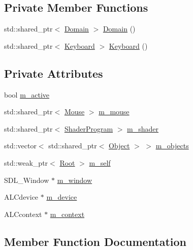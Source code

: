 \subsection*{Private Member Functions}
\begin{DoxyCompactItemize}
\item 
std\+::shared\+\_\+ptr$<$ \mbox{\hyperlink{class_domain}{Domain}} $>$ \mbox{\hyperlink{classharu_1_1_root_a1fd00f081aeeaf09eea1347bdd22ba2a}{Domain}} ()
\item 
std\+::shared\+\_\+ptr$<$ \mbox{\hyperlink{class_keyboard}{Keyboard}} $>$ \mbox{\hyperlink{classharu_1_1_root_a4d3ca0f98e581f98868f76e003c6d710}{Keyboard}} ()
\end{DoxyCompactItemize}
\subsection*{Private Attributes}
\begin{DoxyCompactItemize}
\item 
bool \mbox{\hyperlink{classharu_1_1_root_a5e251a25155fd4cb55b488b6520e1bd4}{m\+\_\+active}}
\item 
std\+::shared\+\_\+ptr$<$ \mbox{\hyperlink{classharu_1_1_mouse}{Mouse}} $>$ \mbox{\hyperlink{classharu_1_1_root_a1d9f5606aebb0fda4a6eb5ca5970c9d1}{m\+\_\+mouse}}
\item 
std\+::shared\+\_\+ptr$<$ \mbox{\hyperlink{classharu_1_1_shader_program}{Shader\+Program}} $>$ \mbox{\hyperlink{classharu_1_1_root_af62f9d3dc17742091234295bd4c6bac4}{m\+\_\+shader}}
\item 
std\+::vector$<$ std\+::shared\+\_\+ptr$<$ \mbox{\hyperlink{classharu_1_1_object}{Object}} $>$ $>$ \mbox{\hyperlink{classharu_1_1_root_a1c2da39d062cc0ccaba26ba446baaa88}{m\+\_\+objects}}
\item 
std\+::weak\+\_\+ptr$<$ \mbox{\hyperlink{classharu_1_1_root}{Root}} $>$ \mbox{\hyperlink{classharu_1_1_root_a36ccda976146da69253d0de01641dbec}{m\+\_\+self}}
\item 
S\+D\+L\+\_\+\+Window $\ast$ \mbox{\hyperlink{classharu_1_1_root_a91725127201f71d5a1f2aebfafac499c}{m\+\_\+window}}
\item 
A\+L\+Cdevice $\ast$ \mbox{\hyperlink{classharu_1_1_root_afaeed3289f7697f80c3b71a68c98db2f}{m\+\_\+device}}
\item 
A\+L\+Ccontext $\ast$ \mbox{\hyperlink{classharu_1_1_root_a922896e42c7813ef55bff4011d12ab88}{m\+\_\+context}}
\end{DoxyCompactItemize}


\subsection{Member Function Documentation}
\mbox{\label{classharu_1_1_root_a058a9ead82bdc50ef1f8e08413c72131}} 
